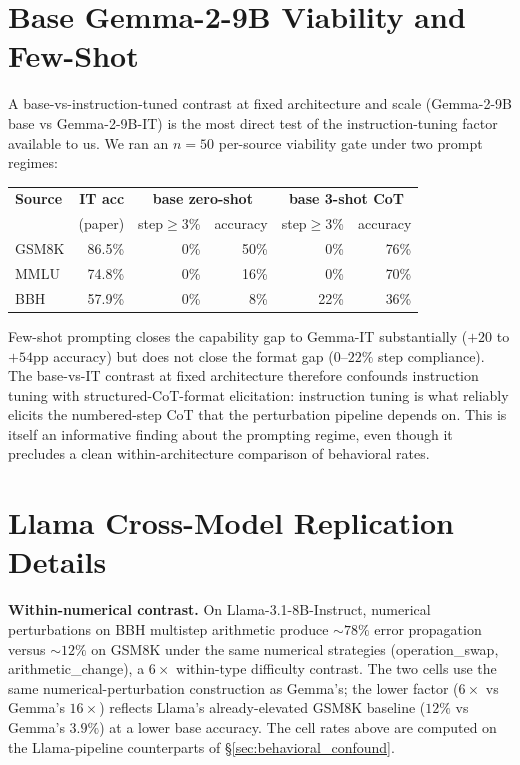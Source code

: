 \documentclass[10pt]{article} %
\begin{document}
\section{Base Gemma-2-9B Viability and Few-Shot}
\label{app:base_gemma}

A base-vs-instruction-tuned contrast at fixed architecture and scale (Gemma-2-9B base vs Gemma-2-9B-IT) is the most direct test of the instruction-tuning factor available to us. We ran an $n = 50$ per-source viability gate under two prompt regimes:

\begin{center}
\scriptsize
\begin{tabular}{lrrrrr}
\toprule
\textbf{Source} & \textbf{IT acc} & \multicolumn{2}{c}{\textbf{base zero-shot}} & \multicolumn{2}{c}{\textbf{base 3-shot CoT}} \\
& (paper) & step$\geq$3\% & accuracy & step$\geq$3\% & accuracy \\
\midrule
GSM8K & 86.5\% & 0\% & 50\% & 0\%  & 76\% \\
MMLU  & 74.8\% & 0\% & 16\% & 0\%  & 70\% \\
BBH   & 57.9\% & 0\% &  8\% & 22\% & 36\% \\
\bottomrule
\end{tabular}
\end{center}

Few-shot prompting closes the capability gap to Gemma-IT substantially ($+20$ to $+54$pp accuracy) but does not close the format gap ($0$--$22\%$ step compliance). The base-vs-IT contrast at fixed architecture therefore confounds instruction tuning with structured-CoT-format elicitation: instruction tuning is what reliably elicits the numbered-step CoT that the perturbation pipeline depends on. This is itself an informative finding about the prompting regime, even though it precludes a clean within-architecture comparison of behavioral rates.


\section{Llama Cross-Model Replication Details}
\label{app:llama_text}

\textbf{Within-numerical contrast.} On Llama-3.1-8B-Instruct, numerical perturbations on BBH multistep arithmetic produce $\sim 78\%$ error propagation versus $\sim 12\%$ on GSM8K under the same numerical strategies (operation\_swap, arithmetic\_change), a $6\times$ within-type difficulty contrast. The two cells use the same numerical-perturbation construction as Gemma's; the lower factor ($6\times$ vs Gemma's $16\times$) reflects Llama's already-elevated GSM8K baseline ($12\%$ vs Gemma's $3.9\%$) at a lower base accuracy. The cell rates above are computed on the Llama-pipeline counterparts of \S\ref{sec:behavioral_confound}.
\end{document}
